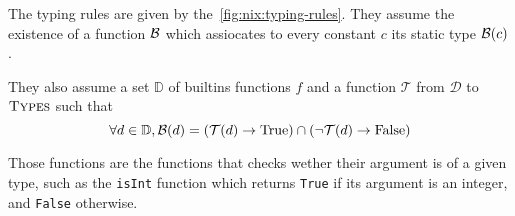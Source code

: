The typing rules are given by the~\autoref{fig:nix:typing-rules}.
They assume the existence of a function $\operatorname{\mathcal{B}}$ which assiocates to every constant
$c$ its static type $\operatorname{\mathcal{B}}(c)$.

They also assume a set $\mathbb{D}$ of builtins functions $f$ and a function
$\mathcal{T}$ from $\mathcal{D}$ to $\textsc{Types}$ such that
\[
  \forall d \in \mathbb{D}, \operatorname{\mathcal{B}}(d) = (\mathcal{T}(d) \rightarrow \text{True})
                          \cap (\lnot\mathcal{T}(d) \rightarrow \text{False})
\]

Those functions are the functions that checks wether their argument is of a
given type, such as the \lstinline{isInt} function which returns
\lstinline{True} if its argument is an integer, and \lstinline{False} otherwise.


\begin{figure}
\end{figure}
